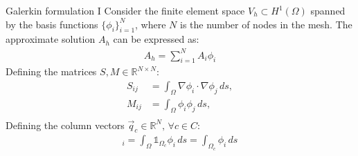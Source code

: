 \documentclass[aspectratio=54,xcolor=dvipsnames]{beamer}
\begin{document}
\begin{frame}{Galerkin formulation I}
    Consider the finite element space $V_h \subset H^1(\Omega)$ spanned by the basis functions $\{\phi_i\}_{i=1}^{N}$, where $N$ is the number of nodes in the mesh. The approximate solution $A_h$ can be expressed as:
    \begin{align*}
        A_h = \sum_{i=1}^{N} A_i \phi_i
    \end{align*}
    Defining the matrices $S, M \in \mathbb{R}^{N \times N}$:
    \begin{align*}
        S_{ij} &= \int_{\Omega} \nabla \phi_i \cdot \nabla \phi_j \, ds, \\
        M_{ij} &= \int_{\Omega} \phi_i \phi_j \, ds, \\
    \end{align*}
    Defining the column vectors $\vec{q}_c \in \mathbb{R}^N, \, \forall c \in C $:
    \begin{align*}
        [\vec{q}_c]_i = \int_{\Omega} \mathds{1}_{\Omega_c} \phi_i \, ds = \int_{\Omega_c} \phi_i \, ds
    \end{align*}

\end{frame}
\end{document}
